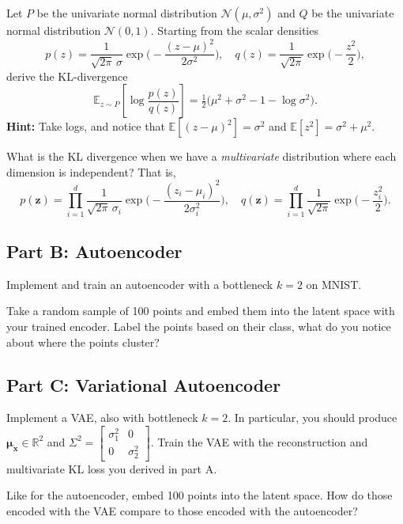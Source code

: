 \documentclass{article}
\begin{document}
Let $P$ be the univariate normal distribution $\mathcal{N}(\mu,\sigma^2)$ and $Q$ be the univariate normal distribution $\mathcal{N}(0,1)$.
Starting from the scalar densities
$$
  p(z)=\frac{1}{\sqrt{2\pi}\,\sigma}\exp\!\Big(-\frac{(z-\mu)^2}{2\sigma^2}\Big),\quad
  q(z)=\frac{1}{\sqrt{2\pi}}\exp\!\Big(-\frac{z^2}{2}\Big),
$$
derive the KL-divergence
$$
  \mathbb{E}_{z\sim P}\left[\log \frac{p(z)}{q(z)}\right]
  =\tfrac12\big(\mu^2+\sigma^2-1-\log\sigma^2\big).
$$
\textbf{Hint:} Take logs, and notice that $\mathbb{E}[(z-\mu)^2]=\sigma^2$ and $\mathbb{E}[z^2]=\sigma^2+\mu^2$. 

What is the KL divergence when we have a \textit{multivariate} distribution where each dimension is independent? That is,
$$
  p(\mathbf{z})=\prod_{i=1}^d \frac{1}{\sqrt{2\pi}\,\sigma_i}\exp\!\Big(-\frac{(z_i-\mu_i)^2}{2\sigma_i^2}\Big),\quad
  q(\mathbf{z})=\prod_{i=1}^d \frac{1}{\sqrt{2\pi}}\exp\!\Big(-\frac{z_i^2}{2}\Big).
$$

\subsection*{Part B: Autoencoder}

Implement and train an autoencoder with a bottleneck $k=2$ on MNIST.

Take a random sample of 100 points and embed them into the latent space with your trained encoder.
Label the points based on their class, what do you notice about where the points cluster?


\subsection*{Part C: Variational Autoencoder}

Implement a VAE, also with bottleneck $k=2$. In particular, you should produce $\mathbf{\mu_x} \in \mathbb{R}^2$ and $\Sigma^2 = \begin{bmatrix}\sigma_1^2 & 0 \\ 0 & \sigma_2^2\end{bmatrix}$.
Train the VAE with the reconstruction and multivariate KL loss you derived in part A.

Like for the autoencoder, embed 100 points into the latent space.
How do those encoded with the VAE compare to those encoded with the autoencoder?

%
\end{document}
